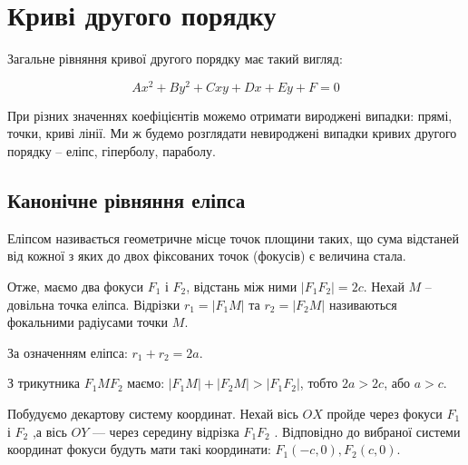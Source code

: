 \chapter{Криві другого порядку}

Загальне рівняння кривої другого порядку має такий вигляд:

$$Ax^2 + By^2 + Cxy + Dx + Ey + F = 0$$

При різних значеннях коефіцієнтів можемо отримати вироджені випадки:
прямі, точки, криві лінії. Ми ж будемо розглядати невироджені випадки кривих
другого порядку – еліпс, гіперболу, параболу. 

\section{Канонічне рівняння еліпса}

\begin{definition}
	Еліпсом називається геометричне місце точок площини таких, що сума
	відстаней від кожної з яких до двох фіксованих точок (фокусів) є величина стала. 
\end{definition}

\noindent\parbox{4cm}{}
\parbox{\textwidth - 4.1cm}{
	Отже, маємо два фокуси $F_1$ і $F_2$, відстань між ними $|F_1F_2| = 2c$. Нехай $M$ – довільна точка
	еліпса. Відрізки $r_1 = |F_1M|$ та $r_2 = |F_2M|$
	називаються фокальними радіусами точки $M$.

	За означенням еліпса: $r_1 + r_2 = 2a$.
}

З трикутника $F_1MF_2$ маємо: $|F_1M| + |F_2M| > |F_1F_2|$, тобто $2a > 2c$, або $a>c$.

\noindent\parbox{6cm}{}
\parbox{\textwidth - 6.1cm}{
	Побудуємо декартову систему
	координат. Нехай вісь $OX$
	пройде через фокуси $F_1$ і $F_2$ ,а
	вісь $OY$ --- через середину
	відрізка $F_1F_2$ . Відповідно до
	вибраної системи координат
	фокуси будуть мати такі
	координати: $F_1(-c,0), F_2(c,0)$. 
}

